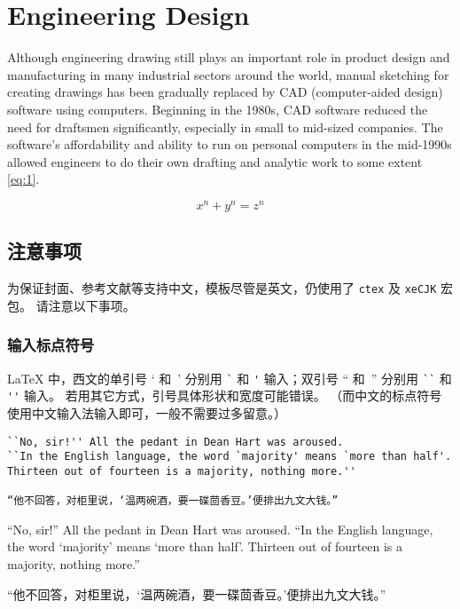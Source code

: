 \chapter{Engineering Design}

Although engineering drawing still plays an important role in product design and manufacturing in many industrial sectors around the world, manual sketching for creating drawings has been gradually replaced by CAD (computer-aided design) software using computers. Beginning in the 1980s, CAD software reduced the need for draftsmen significantly, especially in small to mid-sized companies. The software's affordability and ability to run on personal computers in the mid-1990s allowed engineers to do their own drafting and analytic work to some extent \ref{eq:1}.

\begin{equation}
x^n + y^n = z^n
\label{eq:1}
\end{equation}

\section{注意事项}

为保证封面、参考文献等支持中文，模板尽管是英文，仍使用了 \texttt{ctex} 及 \texttt{xeCJK} 宏包。
请注意以下事项。

\subsection{输入标点符号}


\LaTeX{} 中，西文的单引号 ` 和\ ' 分别用 \verb|`| 和 \verb|'| 输入；双引号 `` 和\ '' 分别用 \verb|``| 和 \verb|''| 输入。
若用其它方式，引号具体形状和宽度可能错误。
（而中文的标点符号使用中文输入法输入即可，一般不需要过多留意。）

\begin{lstlisting}
``No, sir!'' All the pedant in Dean Hart was aroused.
``In the English language, the word `majority' means `more than half'.
Thirteen out of fourteen is a majority, nothing more.''

“他不回答，对柜里说，‘温两碗酒，要一碟茴香豆。’便排出九文大钱。”
\end{lstlisting}

``No, sir!'' All the pedant in Dean Hart was aroused. ``In the English language, the word `majority' means `more than half'. Thirteen out of fourteen is a majority, nothing more.''

“他不回答，对柜里说，‘温两碗酒，要一碟茴香豆。’便排出九文大钱。”

